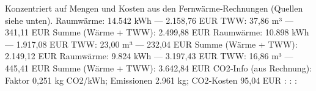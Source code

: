 \markdownRendererDocumentBegin
Konzentriert auf Mengen und Kosten aus den Fernwärme‑Rechnungen (Quellen siehe unten).\markdownRendererInterblockSeparator
{}\markdownRendererSectionBegin
\markdownRendererSectionBegin
{}\markdownRendererInterblockSeparator
{}\markdownRendererUlBeginTight
{}\markdownRendererUlItemEnd 
\markdownRendererUlItem Raumwärme: 14.542 kWh — 2.158,76 EUR\markdownRendererUlItemEnd 
\markdownRendererUlItem TWW: 37,86 m³ — 341,11 EUR\markdownRendererUlItemEnd 
\markdownRendererUlItem Summe (Wärme + TWW): 2.499,88 EUR\markdownRendererUlItemEnd 
{}\markdownRendererUlItemEnd 
\markdownRendererUlItem Raumwärme: 10.898 kWh — 1.917,08 EUR\markdownRendererUlItemEnd 
\markdownRendererUlItem TWW: 23,00 m³ — 232,04 EUR\markdownRendererUlItemEnd 
\markdownRendererUlItem Summe (Wärme + TWW): 2.149,12 EUR\markdownRendererUlItemEnd 
{}\markdownRendererUlItemEnd 
\markdownRendererUlItem Raumwärme: 9.824 kWh — 3.197,43 EUR\markdownRendererUlItemEnd 
\markdownRendererUlItem TWW: 16,86 m³ — 445,41 EUR\markdownRendererUlItemEnd 
\markdownRendererUlItem Summe (Wärme + TWW): 3.642,84 EUR\markdownRendererUlItemEnd 
\markdownRendererUlItem CO2‑Info (aus Rechnung): Faktor 0,251 kg CO2/kWh; Emissionen 2.961 kg; CO2‑Kosten 95,04 EUR\markdownRendererUlItemEnd 
\markdownRendererUlEndTight \markdownRendererInterblockSeparator
{}
\markdownRendererSectionEnd \markdownRendererSectionBegin
{}\markdownRendererInterblockSeparator
{}\markdownRendererUlBeginTight
{}: \markdownRendererUlItemEnd 
{}: \markdownRendererUlItemEnd 
{}: \markdownRendererUlItemEnd 
\markdownRendererUlEndTight 
\markdownRendererSectionEnd 
\markdownRendererSectionEnd \markdownRendererDocumentEnd